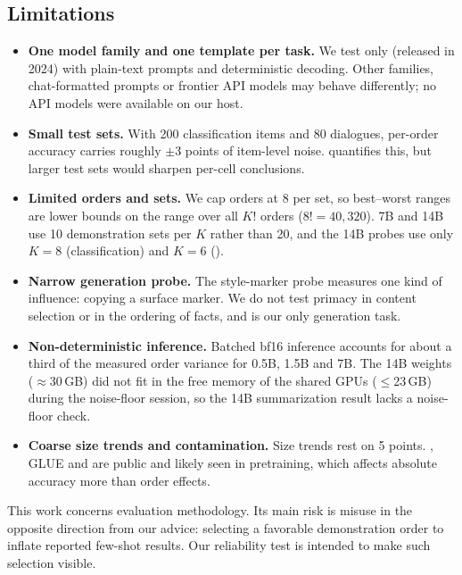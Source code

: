 \subsection{Limitations}
\label{sec:limitations}

\begin{itemize}[leftmargin=*,itemsep=0pt,topsep=0pt]
    \item {\bf One model family and one template per task.} We test only \qwen (released in 2024) with plain-text prompts and deterministic decoding. Other families, chat-formatted prompts or frontier API models may behave differently; no API models were available on our host.
    \item {\bf Small test sets.} With 200 classification items and 80 dialogues, per-order accuracy carries roughly $\pm$3 points of item-level noise.  quantifies this, but larger test sets would sharpen per-cell conclusions.
    \item {\bf Limited orders and sets.} We cap orders at 8 per set, so best--worst ranges are lower bounds on the range over all $K!$ orders ($8!=40{,}320$). 7B and 14B use 10 demonstration sets per $K$ rather than 20, and the 14B probes use only $K=8$ (classification) and $K=6$ (\samsum).
    \item {\bf Narrow generation probe.} The style-marker probe measures one kind of influence: copying a surface marker. We do not test primacy in content selection or in the ordering of facts, and \samsum is our only generation task.
    \item {\bf Non-deterministic inference.} Batched bf16 inference accounts for about a third of the measured \samsum order variance for 0.5B, 1.5B and 7B. The 14B weights ($\approx$30\,GB) did not fit in the free memory of the shared GPUs ($\leq$23\,GB) during the noise-floor session, so the 14B summarization result lacks a noise-floor check.
    \item {\bf Coarse size trends and contamination.} Size trends rest on 5 points. \sst, GLUE and \samsum are public and likely seen in pretraining, which affects absolute accuracy more than order effects.
\end{itemize}

This work concerns evaluation methodology. Its main risk is misuse in the opposite direction from our advice: selecting a favorable demonstration order to inflate reported few-shot results. Our reliability test is intended to make such selection visible.
